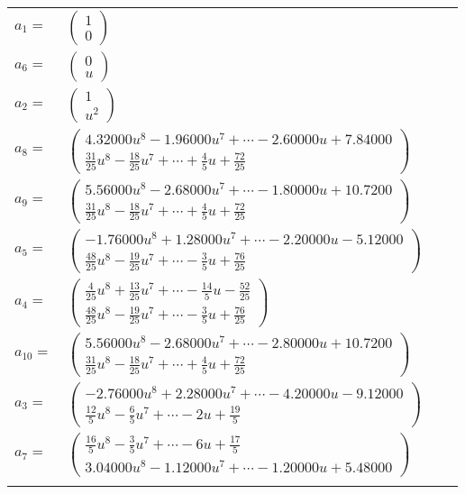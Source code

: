 \documentclass[1p]{elsarticle_modified}
\theoremstyle{definition}
\begin{document}
\begin{tabular}{m{7pt} m{180pt} m{7pt} m{180pt} }
\flushright $a_{1}=$&$\begin{pmatrix}1\\0\end{pmatrix}$ \\
\flushright $a_{6}=$&$\begin{pmatrix}0\\u\end{pmatrix}$ \\
\flushright $a_{2}=$&$\begin{pmatrix}1\\u^2\end{pmatrix}$ \\
\flushright $a_{8}=$&$\begin{pmatrix}4.32000 u^{8}-1.96000 u^{7}+\cdots-2.60000 u+7.84000\\\frac{31}{25} u^8-\frac{18}{25} u^7+\cdots+\frac{4}{5} u+\frac{72}{25}\end{pmatrix}$ \\
\flushright $a_{9}=$&$\begin{pmatrix}5.56000 u^{8}-2.68000 u^{7}+\cdots-1.80000 u+10.7200\\\frac{31}{25} u^8-\frac{18}{25} u^7+\cdots+\frac{4}{5} u+\frac{72}{25}\end{pmatrix}$ \\
\flushright $a_{5}=$&$\begin{pmatrix}-1.76000 u^{8}+1.28000 u^{7}+\cdots-2.20000 u-5.12000\\\frac{48}{25} u^8-\frac{19}{25} u^7+\cdots-\frac{3}{5} u+\frac{76}{25}\end{pmatrix}$ \\
\flushright $a_{4}=$&$\begin{pmatrix}\frac{4}{25} u^8+\frac{13}{25} u^7+\cdots-\frac{14}{5} u-\frac{52}{25}\\\frac{48}{25} u^8-\frac{19}{25} u^7+\cdots-\frac{3}{5} u+\frac{76}{25}\end{pmatrix}$ \\
\flushright $a_{10}=$&$\begin{pmatrix}5.56000 u^{8}-2.68000 u^{7}+\cdots-2.80000 u+10.7200\\\frac{31}{25} u^8-\frac{18}{25} u^7+\cdots+\frac{4}{5} u+\frac{72}{25}\end{pmatrix}$ \\
\flushright $a_{3}=$&$\begin{pmatrix}-2.76000 u^{8}+2.28000 u^{7}+\cdots-4.20000 u-9.12000\\\frac{12}{5} u^8-\frac{6}{5} u^7+\cdots-2 u+\frac{19}{5}\end{pmatrix}$ \\
\flushright $a_{7}=$&$\begin{pmatrix}\frac{16}{5} u^8-\frac{3}{5} u^7+\cdots-6 u+\frac{17}{5}\\3.04000 u^{8}-1.12000 u^{7}+\cdots-1.20000 u+5.48000\end{pmatrix}$\\&\end{tabular}
\end{document}
